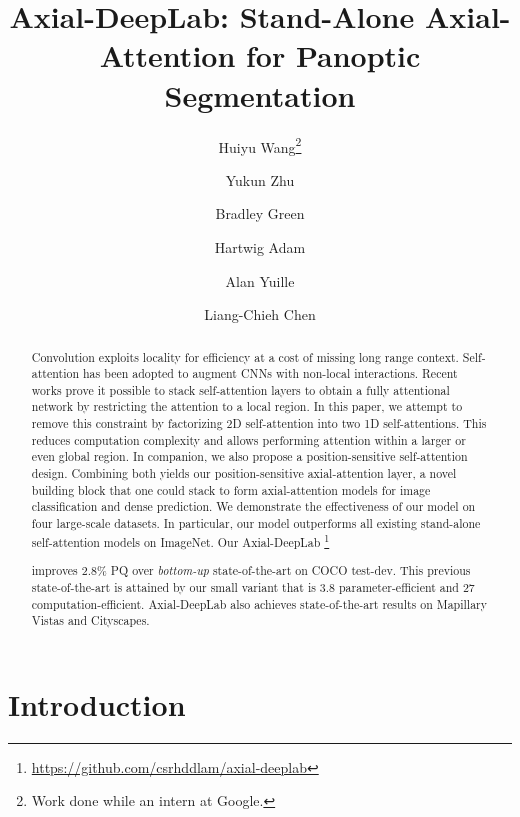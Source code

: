 \documentclass[runningheads]{llncs}
\newcommand\blfootnote[1]{\begingroup
  \renewcommand\thefootnote{}\footnote{#1}\addtocounter{footnote}{-1}\endgroup
}
\begin{document}
\pagestyle{headings}
\mainmatter
\def\ECCVSubNumber{1564}  

\title{Axial-DeepLab: Stand-Alone Axial-Attention for Panoptic Segmentation} 



\author{
Huiyu Wang\thanks{Work done while an intern at Google.}\and
Yukun Zhu \and
Bradley Green \and
Hartwig Adam \and
Alan Yuille \and
Liang-Chieh Chen}
\maketitle

\begin{abstract}
Convolution exploits locality for efficiency at a cost of missing long range context. Self-attention has been adopted to augment CNNs with non-local interactions. Recent works prove it possible to stack self-attention layers to obtain a fully attentional network by restricting the attention to a local region. In this paper, we attempt to remove this constraint by factorizing 2D self-attention into two 1D self-attentions. This reduces computation complexity and allows performing attention within a larger or even global region. In companion, we also propose a position-sensitive self-attention design. Combining both yields our position-sensitive axial-attention layer, a novel building block that one could stack to form axial-attention models for image classification and dense prediction. We demonstrate the effectiveness of our model on four large-scale datasets. In particular, our model outperforms all existing stand-alone self-attention models on ImageNet. Our Axial-DeepLab\blfootnote{\url{https://github.com/csrhddlam/axial-deeplab}} improves 2.8\% PQ over {\it bottom-up} state-of-the-art on COCO test-dev. This previous state-of-the-art is attained by our small variant that is 3.8 parameter-efficient and 27 computation-efficient. Axial-DeepLab also achieves state-of-the-art results on Mapillary Vistas and Cityscapes.
\end{abstract}
\section{Introduction}
\end{document}
